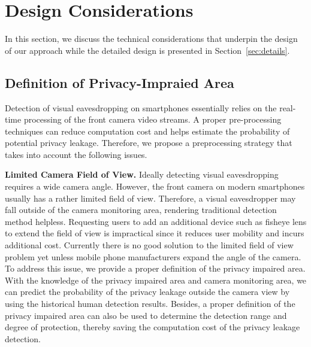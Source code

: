 \section{Design Considerations}

In this section, we discuss the technical considerations that underpin the design of our approach while the detailed design is presented in Section~\ref{sec:details}.


\subsection{Definition of Privacy-Impraied Area}
Detection of visual eavesdropping on smartphones essentially relies on the real-time processing of the front camera video streams. A proper pre-processing techniques can reduce computation cost and helps estimate the probability of potential privacy leakage.  Therefore, we propose a  preprocessing strategy that takes into account the following issues.

\textbf{Limited Camera Field of View.}
Ideally detecting visual eavesdropping requires a wide camera angle.  However, the front camera on modern smartphones usually has a rather limited field of view.  Therefore, a visual eavesdropper may  fall outside of the camera monitoring area, rendering traditional detection method helpless.  Requesting users to add an additional device such as  fisheye lens to extend the field of view is impractical since it reduces user mobility and incurs additional cost.  Currently there is no good solution to the limited field of view problem   yet unless  mobile phone manufacturers expand the angle of the camera.  To address this issue, we provide a proper definition of the privacy impaired area.  With the knowledge of the privacy impaired area and camera monitoring area, we can predict the probability of the privacy leakage outside the camera view by using the historical human detection results. Besides, a proper definition of the privacy impaired area  can also be used to determine the detection range and degree of protection, thereby saving the computation cost of the privacy leakage detection.


